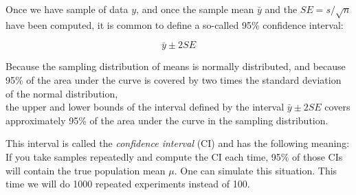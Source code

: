 \documentclass[12pt,]{krantz}
\newenvironment{Shaded}{\begin{snugshade}}{\end{snugshade}}
\newcommand{\CommentTok}[1]{\textcolor[rgb]{0.56,0.35,0.01}{\textit{#1}}}
\newcommand{\ControlFlowTok}[1]{\textcolor[rgb]{0.13,0.29,0.53}{\textbf{#1}}}
\newcommand{\DataTypeTok}[1]{\textcolor[rgb]{0.13,0.29,0.53}{#1}}
\newcommand{\DecValTok}[1]{\textcolor[rgb]{0.00,0.00,0.81}{#1}}
\newcommand{\KeywordTok}[1]{\textcolor[rgb]{0.13,0.29,0.53}{\textbf{#1}}}
\newcommand{\NormalTok}[1]{#1}
\newcommand{\OperatorTok}[1]{\textcolor[rgb]{0.81,0.36,0.00}{\textbf{#1}}}
\newcommand{\OtherTok}[1]{\textcolor[rgb]{0.56,0.35,0.01}{#1}}
\newcommand{\StringTok}[1]{\textcolor[rgb]{0.31,0.60,0.02}{#1}}
\begin{document}
Once we have sample of data \(y\), and once the sample mean \(\bar{y}\) and the \(SE = s/\sqrt{n}\) have been computed, it is common to define a so-called 95\% confidence interval:

\begin{equation}
\bar{y} \pm 2 SE
\end{equation}

Because the sampling distribution of means is normally distributed, and because 95\% of the area under the curve is covered by two times the standard deviation of the normal distribution,\\
the upper and lower bounds of the interval defined by the interval \(\bar{y} \pm 2 SE\) covers approximately 95\% of the area under the curve in the sampling distribution.

This interval is called the \emph{confidence interval} (CI) and has the following meaning: If you take samples repeatedly and compute the CI each time, 95\% of those CIs will contain the true population mean \(\mu\). One can simulate this situation. This time we will do 1000 repeated experiments instead of 100.

\begin{Shaded}
\end{Shaded}
\end{document}
